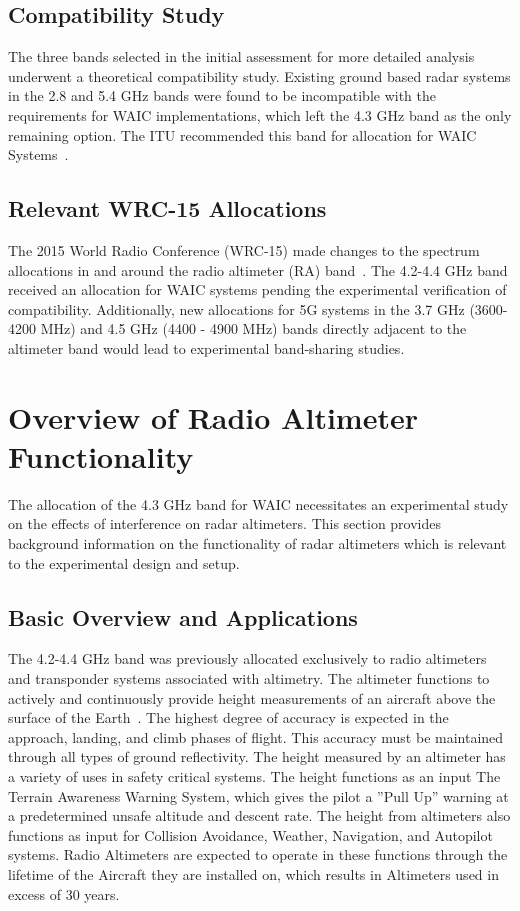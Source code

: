 \subsection{Compatibility Study}
The three bands selected in the initial assessment for more detailed analysis underwent a theoretical compatibility study. Existing ground based radar systems in the 2.8 and 5.4 GHz bands were found to be incompatible with the requirements for WAIC implementations, which left the 4.3 GHz band as the only remaining option. The ITU recommended this band for allocation for WAIC Systems~\cite{noauthor_consideration_2014}.

\subsection{Relevant WRC-15 Allocations}
The 2015 World Radio Conference (WRC-15) made changes to the spectrum allocations in and around the radio altimeter (RA) band~\cite{noauthor_final_2015}. The 4.2-4.4 GHz band received an allocation for WAIC systems pending the experimental verification of compatibility. Additionally, new allocations for 5G systems in the 3.7 GHz (3600-4200 MHz) and 4.5 GHz (4400 - 4900 MHz) bands directly adjacent to the altimeter band would lead to experimental band-sharing studies. 

\section{Overview of Radio Altimeter Functionality}
The allocation of the 4.3 GHz band for WAIC necessitates an experimental study on the effects of interference on radar altimeters. This section provides background information on the functionality of radar altimeters which is relevant to the experimental design and setup.
\subsection{Basic Overview and Applications}
The 4.2-4.4 GHz band was previously allocated exclusively to radio altimeters and transponder systems associated with altimetry. The altimeter functions to actively and continuously provide height measurements of an aircraft above the surface of the Earth~\cite{noauthor_operational_2014}. The highest degree of accuracy is expected in the approach, landing, and climb phases of flight. This accuracy must be maintained through all types of ground reflectivity. The height measured by an altimeter has a variety of uses in safety critical systems. The height functions as an input The Terrain Awareness Warning System, which gives the pilot a  ''Pull Up'' warning at a predetermined unsafe altitude and descent rate. The height from altimeters also functions as input for Collision Avoidance, Weather, Navigation, and Autopilot systems. Radio Altimeters are expected to operate in these functions through the lifetime of the Aircraft they are installed on, which results in Altimeters used in excess of 30 years.

